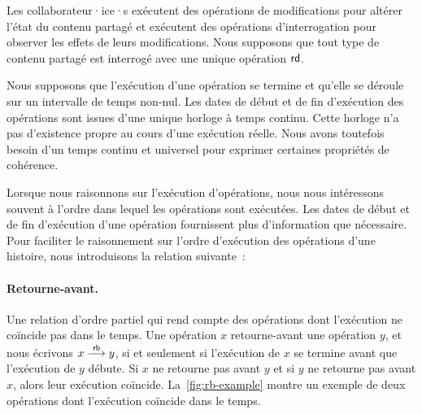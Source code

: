 Les collaborateur·ice·s exécutent des opérations de modifications pour altérer l'état du contenu partagé et exécutent des opérations d'interrogation pour observer les effets de leurs modifications.
Nous supposons que tout type de contenu partagé est interrogé avec une unique opération $\operatorname{\mathsf{rd}}$.

Nous supposons que l'exécution d'une opération se termine et qu'elle se déroule sur un intervalle de temps non-nul.
Les dates de début et de fin d'exécution des opérations sont issues d'une unique horloge à temps continu.
Cette horloge n'a pas d'existence propre au cours d'une exécution réelle.
Nous avons toutefois besoin d'un temps continu et universel pour exprimer certaines propriétés de cohérence.

Lorsque nous raisonnons sur l'exécution d'opérations, nous nous intéressons souvent à l'ordre dans lequel les opérations sont exécutées.
Les dates de début et de fin d'exécution d'une opération fournissent plus d'information que nécessaire.
Pour faciliter le raisonnement sur l'ordre d'exécution des opérations d'une histoire, nous introduisons la relation suivante~:

\paragraph{Retourne-avant.} Une relation d'ordre partiel qui rend compte des opérations dont l'exécution ne coïncide pas dans le temps.
Une opération $x$ retourne-avant une opération $y$, et nous écrivons $x \overset{\mathsf{rb}}{\longrightarrow} y$, si et seulement si l'exécution de $x$ se termine avant que l'exécution de $y$ débute.
Si $x$ ne retourne pas avant $y$ et si $y$ ne retourne pas avant $x$, alors leur exécution coïncide.
La~\autoref{fig:rb-example} montre un exemple de deux opérations dont l'exécution coïncide dans le temps.

